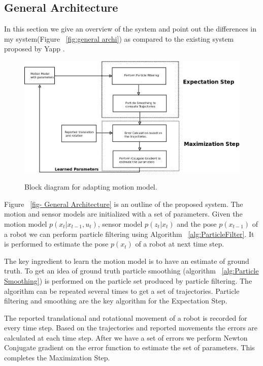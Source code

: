 \documentclass[12pt,draft]{dalcsthesis}
\begin{document}
\subsection{General Architecture}
In this section we give an overview of the system and point out the differences in my system(Figure ~\ref{fig:general archi}) as compared to the existing system proposed by Yapp \cite{Yap2008}. 
\begin{figure}
  \centering
     {\includegraphics[height = 3.0 in]{Diagram1.jpeg}}
  \caption{\label{fig-General Architecture} Block diagram for adapting motion model.}
\end{figure}
Figure ~\ref{fig- General Architecture} is an outline of the proposed system. The motion and sensor models are initialized with a set of parameters. Given the motion model $p(x_{t}|x_{t-1},u_{t})$, sensor model $p(z_{t}|x_{t})$ and the pose $p(x_{t-1})$ of a robot we can perform particle filtering using Algorithm ~\ref{alg:ParticleFilter}. It is performed to estimate the pose $p(x_{t})$ of a robot at next time step. 

The key ingredient to learn the motion model is to have an estimate of ground truth. To get an idea of ground truth particle smoothing (algorithm ~\ref{alg:Particle Smoothing}) is performed on the particle set produced by particle filtering. The algorithm can be repeated several times to get a set of trajectories. Particle filtering and smoothing are the key algorithm for the Expectation Step. 

The reported translational and rotational movement of a robot is recorded for every time step. Based on the trajectories and reported movements the errors are calculated at each time step. After we have a set of errors we perform Newton Conjugate gradient on the error function to estimate the set of parameters. This completes the Maximization Step.
\end{document}
